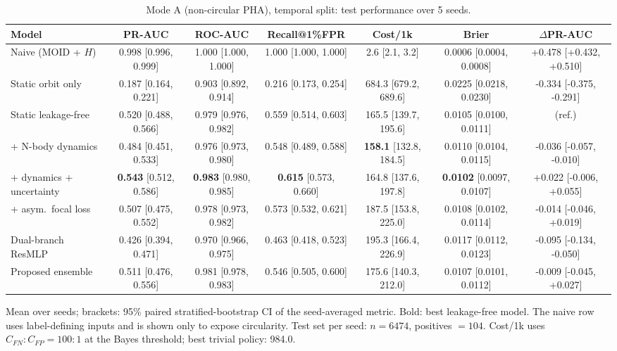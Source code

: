 \begin{table}[t]
\centering
\small
\caption{Mode A (non-circular PHA), temporal split: test performance over 5 seeds.}
\label{tab:pha_temporal_all}
\begin{tabular}{lcccccc}
\toprule
Model & PR-AUC & ROC-AUC & Recall@1\%FPR & Cost/1k & Brier & $\Delta$PR-AUC \\
\midrule
Naive (MOID + $H$) & 0.998 \scriptsize{[0.996, 0.999]} & 1.000 \scriptsize{[1.000, 1.000]} & 1.000 \scriptsize{[1.000, 1.000]} & 2.6 \scriptsize{[2.1, 3.2]} & 0.0006 \scriptsize{[0.0004, 0.0008]} & +0.478 \scriptsize{[+0.432, +0.510]} \\
\midrule
Static orbit only & 0.187 \scriptsize{[0.164, 0.221]} & 0.903 \scriptsize{[0.892, 0.914]} & 0.216 \scriptsize{[0.173, 0.254]} & 684.3 \scriptsize{[679.2, 689.6]} & 0.0225 \scriptsize{[0.0218, 0.0230]} & -0.334 \scriptsize{[-0.375, -0.291]} \\
Static leakage-free & 0.520 \scriptsize{[0.488, 0.566]} & 0.979 \scriptsize{[0.976, 0.982]} & 0.559 \scriptsize{[0.514, 0.603]} & 165.5 \scriptsize{[139.7, 195.6]} & 0.0105 \scriptsize{[0.0100, 0.0111]} & (ref.) \\
+ N-body dynamics & 0.484 \scriptsize{[0.451, 0.533]} & 0.976 \scriptsize{[0.973, 0.980]} & 0.548 \scriptsize{[0.489, 0.588]} & \textbf{158.1} \scriptsize{[132.8, 184.5]} & 0.0110 \scriptsize{[0.0104, 0.0115]} & -0.036 \scriptsize{[-0.057, -0.010]} \\
+ dynamics + uncertainty & \textbf{0.543} \scriptsize{[0.512, 0.586]} & \textbf{0.983} \scriptsize{[0.980, 0.985]} & \textbf{0.615} \scriptsize{[0.573, 0.660]} & 164.8 \scriptsize{[137.6, 197.8]} & \textbf{0.0102} \scriptsize{[0.0097, 0.0107]} & +0.022 \scriptsize{[-0.006, +0.055]} \\
+ asym.\ focal loss & 0.507 \scriptsize{[0.475, 0.552]} & 0.978 \scriptsize{[0.973, 0.982]} & 0.573 \scriptsize{[0.532, 0.621]} & 187.5 \scriptsize{[153.8, 225.0]} & 0.0108 \scriptsize{[0.0102, 0.0114]} & -0.014 \scriptsize{[-0.046, +0.019]} \\
Dual-branch ResMLP & 0.426 \scriptsize{[0.394, 0.471]} & 0.970 \scriptsize{[0.966, 0.975]} & 0.463 \scriptsize{[0.418, 0.523]} & 195.3 \scriptsize{[166.4, 226.9]} & 0.0117 \scriptsize{[0.0112, 0.0123]} & -0.095 \scriptsize{[-0.134, -0.050]} \\
Proposed ensemble & 0.511 \scriptsize{[0.476, 0.556]} & 0.981 \scriptsize{[0.978, 0.983]} & 0.546 \scriptsize{[0.505, 0.600]} & 175.6 \scriptsize{[140.3, 212.0]} & 0.0107 \scriptsize{[0.0101, 0.0112]} & -0.009 \scriptsize{[-0.045, +0.027]} \\
\bottomrule
\end{tabular}
\par\vspace{2pt}\footnotesize Mean over seeds; brackets: 95\% paired stratified-bootstrap CI of the seed-averaged metric. Bold: best leakage-free model. The naive row uses label-defining inputs and is shown only to expose circularity. Test set per seed: $n=6474$, positives $=104$. Cost/1k uses $C_{FN}{:}C_{FP}=100{:}1$ at the Bayes threshold; best trivial policy: 984.0.
\end{table}
